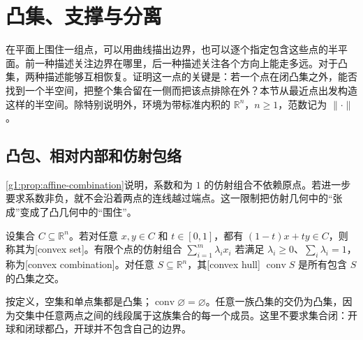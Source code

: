 
% 
% 

\section{凸集、支撑与分离}
\label{g1:sec:0301}

在平面上围住一组点，可以用曲线描出边界，也可以逐个指定包含这些点的半平面。前一种描述关注边界在哪里，后一种描述关注各个方向上能走多远。对于凸集，两种描述能够互相恢复。证明这一点的关键是：若一个点在闭凸集之外，能否找到一个半空间，把整个集合留在一侧而把该点排除在外？本节从最近点出发构造这样的半空间。除特别说明外，环境为带标准内积的 \(\mathbb R^n\)，\(n\geq1\)，范数记为 \(\lVert\cdot\rVert\)。

\subsection{凸包、相对内部和仿射包络}
\label{g1:subsec:0301:01}

\cref{g1:prop:affine-combination}说明，系数和为 \(1\) 的仿射组合不依赖原点。若进一步要求系数非负，就不会沿着两点的连线越过端点。这一限制把仿射几何中的“张成”变成了凸几何中的“围住”。

\begin{definition}[凸集与凸包]\label{g1:def:convex-hull}
	设集合 \(C\subseteq\mathbb R^n\)。若对任意 \(x,y\in C\) 和 \(t\in[0,1]\)，都有 \((1-t)x+ty\in C\)，则称其为[convex set]。有限个点的仿射组合 \(\sum_{i=1}^m\lambda_i x_i\) 若满足 \(\lambda_i\geq0\)、\(\sum_i\lambda_i=1\)，称为[convex combination]。对任意 \(S\subseteq\mathbb R^n\)，其[convex hull] \(\operatorname{conv}S\) 是所有包含 \(S\) 的凸集之交。
\end{definition}

按定义，空集和单点集都是凸集；\(\operatorname{conv}\varnothing=\varnothing\)。任意一族凸集的交仍为凸集，因为交集中任意两点之间的线段属于这族集合的每一个成员。这里不要求集合闭：开球和闭球都凸，开球并不包含自己的边界。

